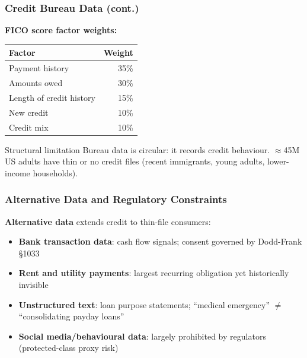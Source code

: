 \documentclass[9pt,t]{beamer}
\begin{document}
\begin{frame}
\frametitle{Credit Bureau Data (cont.)}

\textbf{FICO score factor weights:}
\begin{center}
\begin{tabular}{lr}
\toprule
Factor & Weight \\
\midrule
Payment history & 35\% \\
Amounts owed & 30\% \\
Length of credit history & 15\% \\
New credit & 10\% \\
Credit mix & 10\% \\
\bottomrule
\end{tabular}
\end{center}

\medskip
\begin{alertblock}{Structural limitation}
  Bureau data is circular: it records credit behaviour.
  $\approx$45M US adults have thin or no credit files (recent immigrants, young adults, lower-income households).
\end{alertblock}
\end{frame}

\begin{frame}
\frametitle{Alternative Data and Regulatory Constraints}

\textbf{Alternative data} extends credit to thin-file consumers:
\begin{itemize}
  \item \textbf{Bank transaction data}: cash flow signals; consent governed by Dodd-Frank \S1033
  \item \textbf{Rent and utility payments}: largest recurring obligation yet historically invisible
  \item \textbf{Unstructured text}: loan purpose statements; ``medical emergency'' $\neq$ ``consolidating payday loans''
  \item \textbf{Social media/behavioural data}: largely prohibited by regulators (protected-class proxy risk)
\end{itemize}
\end{frame}
\end{document}
